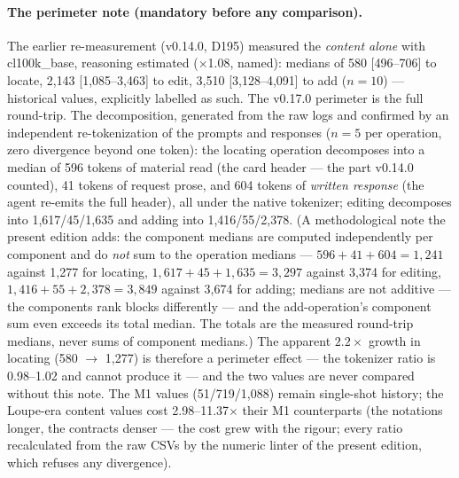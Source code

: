 \documentclass[11pt,a4paper]{article}
\begin{document}
\paragraph{The perimeter note (mandatory before any comparison).}
The earlier re-measurement (v0.14.0, D195) measured the \emph{content
alone} with cl100k\_base, reasoning estimated ($\times$1.08, named):
medians of 580 [496--706] to locate, 2{,}143 [1{,}085--3{,}463] to edit,
3{,}510 [3{,}128--4{,}091] to add ($n{=}10$) --- historical values,
explicitly labelled as such. The v0.17.0 perimeter is the full
round-trip. The decomposition, generated from the raw logs and
confirmed by an independent re-tokenization of the prompts and responses
($n{=}5$ per operation, zero divergence beyond one token): the locating
operation decomposes into a median of 596 tokens of material read (the
card header --- the part v0.14.0 counted), 41 tokens of request prose,
and 604 tokens of \emph{written response} (the agent re-emits the full
header), all under the native tokenizer; editing decomposes into
1{,}617/45/1{,}635 and adding into 1{,}416/55/2{,}378. (A
methodological note the present edition adds: the component medians are
computed independently per component and do \emph{not} sum to the
operation medians --- $596{+}41{+}604 = 1{,}241$ against 1{,}277 for
locating, $1{,}617{+}45{+}1{,}635 = 3{,}297$ against 3{,}374 for
editing, $1{,}416{+}55{+}2{,}378 = 3{,}849$ against 3{,}674 for adding;
medians are not additive --- the components rank blocks differently ---
and the add-operation's component sum even exceeds its total median.
The totals are the measured round-trip medians, never sums of component
medians.) The apparent
$2.2\times$ growth in locating (580 $\to$ 1{,}277) is therefore a
perimeter effect --- the tokenizer ratio is 0.98--1.02 and cannot
produce it --- and the two values are never compared without this note.
The M1 values (51/719/1{,}088) remain single-shot history; the
Loupe-era content values cost 2.98--11.37$\times$ their M1 counterparts
(the notations longer, the contracts denser --- the cost grew with the
rigour; every ratio recalculated from the raw CSVs by the numeric
linter of the present edition, which refuses any divergence).
\end{document}
